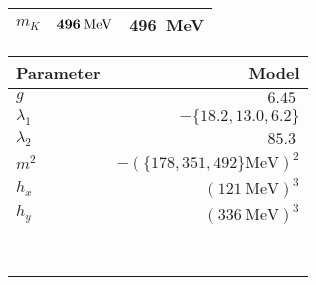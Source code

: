 \begin{table}
\begin{tabular}{ l r r }
	$m_K$             & $\textbf{\SI{496}{\mega\electronvolt}}$ & \SI{496}{\mega\electronvolt}                     \\
	\bottomrule
\end{tabular}
\hfill
\begin{tabular}{ l r }
	\toprule
	Parameter   & Model                                 \\
	\midrule
	$g$         & $\SI{6.45}{}$                         \\
	$\lambda_1$ & $-\{18.2,13.0,6.2\}$                        \\
	$\lambda_2$ & $ \SI{85.3}{}$                        \\
	$m^2$       & $-(\{178,351,492\}\si{\mega\electronvolt})^2$ \\
	$h_x$       & $(\SI{121}{\mega\electronvolt})^3$  \\
	$h_y$       & $(\SI{336}{\mega\electronvolt})^3$  \\
	\\
	\\
	\\
	\\
	\\
	\\
	\\
	\vspace{-2pt} \\ %
	\bottomrule 
\end{tabular}
\end{table}

